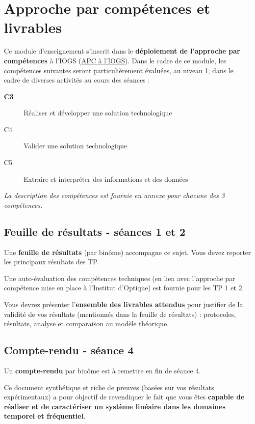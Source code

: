 \documentclass[a4paper,11pt,twoside]{book} %
\begin{document}
{\newpage
\section{Approche par compétences et livrables}

Ce module d'enseignement s'inscrit dans le \textbf{déploiement de l'approche par compétences} à l'IOGS (\href{https://tinyurl.com/APC-IOGS}{APC à l'IOGS}). Dans le cadre de ce module, les compétences suivantes seront particulièrement évaluées, au niveau 1, dans le cadre de diverses activités au cours des séances :

\begin{description}
	\item[\textbf{C3}] Réaliser et développer une solution technologique
	\item[C4] Valider une solution technologique
	\item[C5] Extraire et interpréter des informations et des données
\end{description}

\textit{La description des compétences est fournie en annexe pour chacune des 3 compétences.}


\subsection{Feuille de résultats - séances 1 et 2}

Une \textbf{feuille de résultats} (par binôme) accompagne ce sujet. Vous devez reporter les principaux résultats des TP.

Une auto-évaluation des compétences techniques (en lien avec l'approche par compétence mise en place à l'Institut d'Optique) est fournie pour les TP 1 et 2.

\medskip

Vous devrez présenter l'\textbf{ensemble des livrables attendus} pour justifier de la validité de vos résultats (mentionnés dans la feuille de résultats) : protocoles, résultats, analyse et comparaison au modèle théorique. %


\subsection{Compte-rendu - séance 4}

Un \textbf{compte-rendu} par binôme est à remettre en fin de séance 4.

Ce document synthétique et riche de preuves (basées sur vos résultats expérimentaux) a pour objectif de revendiquer le fait que vous êtes \textbf{capable de réaliser et de caractériser un système linéaire dans les domaines temporel et fréquentiel}.

}
\end{document}
